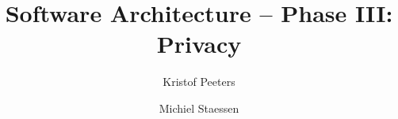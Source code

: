 \documentclass[11pt,a4paper,oneside]{book}
\begin{document}
\frontmatter



\title{Software Architecture -- Phase III: Privacy}
\author{Kristof Peeters \and Michiel Staessen}

\tableofcontents

\mainmatter



\end{document}
